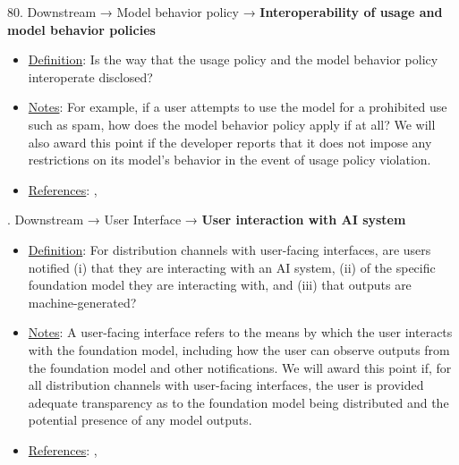 80. Downstream → Model behavior policy → \textbf{Interoperability of usage and model behavior policies}
\vspace{-\parskip}
\begin{itemize}
	\item
	\underline{Definition}: Is the way that the usage policy and the model behavior policy interoperate disclosed?
	\item
	\underline{Notes}: For example, if a user attempts to use the model for a prohibited use such as spam, how does the model behavior policy apply if at all? We will also award this point if the developer reports that it does not impose any restrictions on its model's behavior in the event of usage policy violation.
	\item
	\underline{References}: \citet{reuter2023im}, \citet{qi2023finetuning}
\end{itemize} \vspace{\baselineskip}


. Downstream → User Interface → \textbf{User interaction with AI system}
\vspace{-\parskip}
\begin{itemize}
	\item
	\underline{Definition}: For distribution channels with user-facing interfaces, are users notified (i) that they are interacting with an AI system, (ii) of the specific foundation model they are interacting with, and (iii) that outputs are machine-generated?
	\item
	\underline{Notes}: A user-facing interface refers to the means by which the user interacts with the foundation model, including how the user can observe outputs from the foundation model and other notifications. We will award this point if, for all distribution channels with user-facing interfaces, the user is provided adequate transparency as to the foundation model being distributed and the potential presence of any model outputs.
	\item
	\underline{References}: \citet{qiaosi2023ux}, \citet{nakao2022responsible}
\end{itemize} \vspace{\baselineskip}


